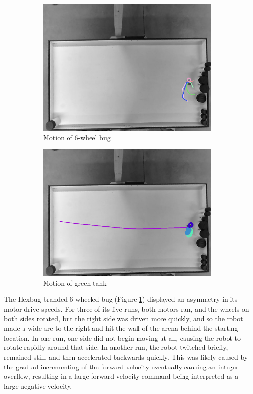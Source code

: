 \begin{figure}[h]
	\begin{subfigure}[t]{0.47\textwidth}
		\includegraphics[width=\textwidth]{../hardwareX_paper/robot_6.png}
		\caption{Motion of 6-wheel bug\label{fig:bug_motion}}
	\end{subfigure}
	\begin{subfigure}[t]{0.47\textwidth}
		\includegraphics[width=\textwidth]{../hardwareX_paper/robot_0.png}
		\caption{Motion of green tank\label{fig:green_tank_motion}}
	\end{subfigure}
	\caption{} %
\end{figure}


The Hexbug-branded 6-wheeled bug (Figure \ref{fig:bug_motion}) displayed an asymmetry in its motor drive speeds. 
For three of its five runs, both motors ran, and the wheels on both sides rotated, but the right side was driven more quickly, and so the robot made a wide arc to the right and hit the wall of the arena behind the starting location. 
In one run, one side did not begin moving at all, causing the robot to rotate rapidly around that side. 
In another run, the robot twitched briefly, remained still, and then accelerated backwards quickly. 
This was likely caused by the gradual incrementing of the forward velocity eventually causing an integer overflow, resulting in a large forward velocity command being interpreted as a large negative velocity.


